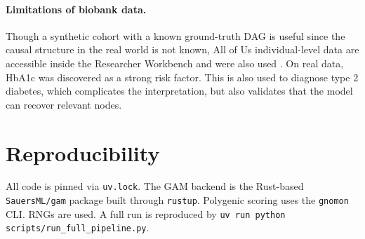 \documentclass[11pt]{article}
\begin{document}
\paragraph{Limitations of biobank data.}
Though a synthetic cohort with a known ground-truth DAG is useful since the causal structure in the real world is not known, All of Us individual-level data are accessible inside the Researcher Workbench and were also used \citep{AllofUs2024}. On real data, HbA1c was discovered as a strong risk factor. This is also used to diagnose type 2 diabetes, which complicates the interpretation, but also validates that the model can recover relevant nodes.

\section{Reproducibility}

All code is pinned via \texttt{uv.lock}. The GAM backend is the Rust-based \texttt{SauersML/gam} package built through \texttt{rustup}. Polygenic scoring uses the \texttt{gnomon} CLI. RNGs are used. A full run is reproduced by \texttt{uv run python scripts/run\_full\_pipeline.py}.



\end{document}
